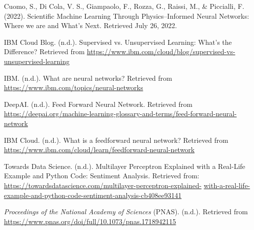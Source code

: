 \documentclass{article}
\begin{document}
\begin{thebibliography}{9}

     Cuomo, S., Di Cola, V. S., Giampaolo, F., Rozza, G., Raissi, M., \& Piccialli, F. (2022). Scientific Machine Learning Through Physics–Informed Neural Networks: Where we are and What’s Next. Retrieved July 26, 2022.
    
     IBM Cloud Blog. (n.d.). Supervised vs. Unsupervised Learning: What’s the Difference? Retrieved from \url{https://www.ibm.com/cloud/blog/supervised-vs-unsupervised-learning}
    
     IBM. (n.d.). What are neural networks? Retrieved from \url{https://www.ibm.com/topics/neural-networks}
    
     DeepAI. (n.d.). Feed Forward Neural Network. Retrieved from \url{https://deepai.org/machine-learning-glossary-and-terms/feed-forward-neural-network}
    
     IBM Cloud. (n.d.). What is a feedforward neural network? Retrieved from \url{https://www.ibm.com/cloud/learn/feedforward-neural-network}
    
     Towards Data Science. (n.d.). Multilayer Perceptron Explained with a Real-Life Example and Python Code: Sentiment Analysis. Retrieved from: \newline
    \url{https://towardsdatascience.com/multilayer-perceptron-explained-} \url{
    with-a-real-life-example-and-python-code-sentiment-analysis-cb408ee93141}
    
     \textit{Proceedings of the National Academy of Sciences} (PNAS). (n.d.). Retrieved from \url{https://www.pnas.org/doi/full/10.1073/pnas.1718942115}
    
\end{thebibliography}
\end{document}
